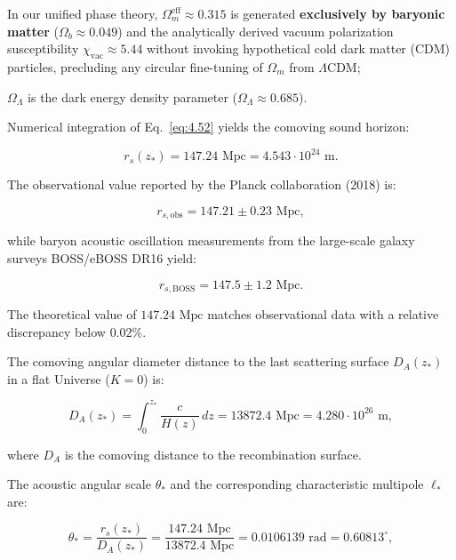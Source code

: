 \documentclass[11pt,a4paper]{article}
\theoremstyle{definition}
\begin{document}
In our unified phase theory, $\Omega_m^{\text{eff}} \approx 0.315$ is generated \textbf{exclusively by baryonic matter} ($\Omega_b \approx 0.049$) and the analytically derived vacuum polarization susceptibility $\chi_{\text{vac}} \approx 5.44$ without invoking hypothetical cold dark matter (CDM) particles, precluding any circular fine-tuning of $\Omega_m$ from $\Lambda\text{CDM}$;  

$\Omega_\Lambda$ is the dark energy density parameter ($\Omega_\Lambda \approx 0.685$).

Numerical integration of Eq.~\eqref{eq:4.52} yields the comoving sound horizon:

\begin{equation}\label{eq:4.55}\tag{4.55}
r_s(z_*) = 147.24\text{ Mpc} = 4.543 \cdot 10^{24}\text{ m}.
\end{equation}

The observational value reported by the Planck collaboration (2018) is:

\begin{equation}\label{eq:4.56}\tag{4.56}
r_{s, \text{obs}} = 147.21 \pm 0.23\text{ Mpc},
\end{equation}

while baryon acoustic oscillation measurements from the large-scale galaxy surveys BOSS/eBOSS DR16 \cite{ref34} yield:

\begin{equation}\label{eq:4.57}\tag{4.57}
r_{s, \text{BOSS}} = 147.5 \pm 1.2\text{ Mpc}.
\end{equation}

The theoretical value of $147.24\text{ Mpc}$ matches observational data with a relative discrepancy below $0.02\%$.

The comoving angular diameter distance to the last scattering surface $D_A(z_*)$ in a flat Universe ($K = 0$) is:

\begin{equation}\label{eq:4.58}\tag{4.58}
D_A(z_*) = \int_0^{z_*} \frac{c}{H(z)} \, dz = 13872.4\text{ Mpc} = 4.280 \cdot 10^{26}\text{ m},
\end{equation}

where $D_A$ is the comoving distance to the recombination surface.

The acoustic angular scale $\theta_*$ and the corresponding characteristic multipole $\ell_*$ are:

\begin{equation}\label{eq:4.59}\tag{4.59}
\theta_* = \frac{r_s(z_*)}{D_A(z_*)} = \frac{147.24\text{ Mpc}}{13872.4\text{ Mpc}} = 0.0106139\text{ rad} = 0.60813^\circ,
\end{equation}
\end{document}
